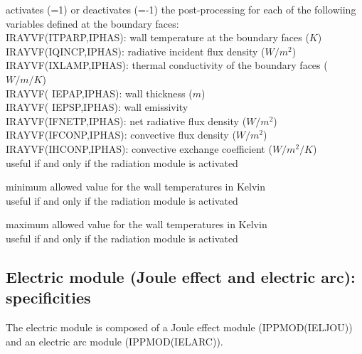{activates (=1) or deactivates (=-1) the post-processing for each of the
followiing variables defined at the boundary faces:\\
\hspace*{1.3cm} IRAYVF(ITPARP,IPHAS): wall temperature at the boundary
faces ($K$)\\ 
\hspace*{1.3cm} IRAYVF(IQINCP,IPHAS): radiative incident flux density
($W/m^2$)\\ 
\hspace*{1.3cm} IRAYVF(IXLAMP,IPHAS): thermal conductivity of the
boundary faces ($W/m/K$)\\
\hspace*{1.3cm} IRAYVF( IEPAP,IPHAS): wall thickness ($m$)\\
\hspace*{1.3cm} IRAYVF( IEPSP,IPHAS): wall emissivity \\
\hspace*{1.3cm} IRAYVF(IFNETP,IPHAS): net radiative flux density ($W/m^2$)\\
\hspace*{1.3cm} IRAYVF(IFCONP,IPHAS): convective flux density ($W/m^2$)\\
\hspace*{1.3cm} IRAYVF(IHCONP,IPHAS): convective exchange coefficient
($W/m^2/K$)\\ 
useful if and only if the radiation module is activated}

{minimum allowed value for the wall temperatures in Kelvin\\
useful if and only if the radiation module is activated}

{maximum allowed value for the wall temperatures in Kelvin\\
useful if and only if the radiation module is activated}

\subsection{Electric module (Joule effect and electric arc): specificities}

The electric module is composed of a Joule effect module
(IPPMOD(IELJOU)) and an electric arc module
(IPPMOD(IELARC)).  

